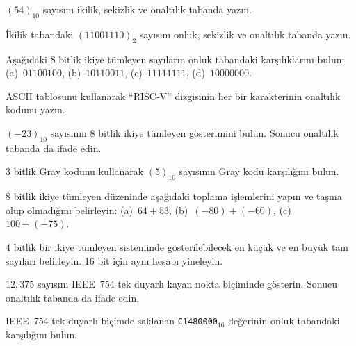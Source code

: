 \begin{alistirma}[\kolay]
$(54)_{10}$ sayısını ikilik, sekizlik ve onaltılık tabanda yazın.
\end{alistirma}

\begin{alistirma}[\kolay]
İkilik tabandaki $(11001110)_2$ sayısını onluk, sekizlik ve onaltılık tabanda yazın.
\end{alistirma}

\begin{alistirma}[\kolay]
Aşağıdaki 8 bitlik ikiye tümleyen sayıların onluk tabandaki karşılıklarını bulun: (a)~$01100100$, (b)~$10110011$, (c)~$11111111$, (d)~$10000000$.
\end{alistirma}

\begin{alistirma}[\kolay]
ASCII tablosunu kullanarak ``RISC-V'' dizgisinin her bir karakterinin onaltılık kodunu yazın.
\end{alistirma}

\begin{alistirma}[\kolay]
$(-23)_{10}$ sayısının 8 bitlik ikiye tümleyen gösterimini bulun. Sonucu onaltılık tabanda da ifade edin.
\end{alistirma}

\begin{alistirma}[\kolay]
3 bitlik Gray kodunu kullanarak $(5)_{10}$ sayısının Gray kodu karşılığını bulun.
\end{alistirma}

\begin{alistirma}[\orta]
8 bitlik ikiye tümleyen düzeninde aşağıdaki toplama işlemlerini yapın ve taşma olup olmadığını belirleyin: (a)~$64 + 53$, (b)~$(-80) + (-60)$, (c)~$100 + (-75)$.
\end{alistirma}

\begin{alistirma}[\orta]
4 bitlik bir ikiye tümleyen sisteminde gösterilebilecek en küçük ve en büyük tam sayıları belirleyin. 16 bit için aynı hesabı yineleyin.
\end{alistirma}

\begin{alistirma}[\orta]
$12{,}375$ sayısını IEEE~754 tek duyarlı kayan nokta biçiminde gösterin. Sonucu onaltılık tabanda da ifade edin.
\end{alistirma}

\begin{alistirma}[\orta]
IEEE~754 tek duyarlı biçimde saklanan \texttt{C1480000}$_{16}$ değerinin onluk tabandaki karşılığını bulun.
\end{alistirma}

